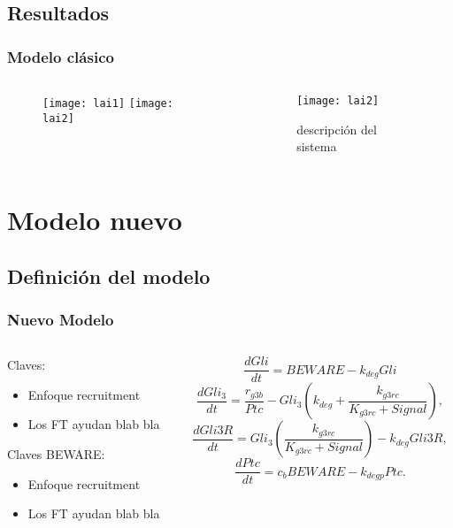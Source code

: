 \documentclass{beamer}
\begin{document}
\subsection{Resultados}
\begin{frame}
\frametitle{Modelo clásico}
\begin{columns}
	\begin{column}{0.5\textwidth}
		\begin{figure}
			\texttt{[image: lai1]}
			\texttt{[image: lai2]}
		\end{figure}
	\end{column}
	\begin{column}{0.5\textwidth}
		\begin{figure}
			\texttt{[image: lai2]}\caption{descripción del sistema}
		\end{figure}
	\end{column}
\end{columns}
\end{frame}

\section{Modelo nuevo}

\subsection{Definición del modelo}

\begin{frame}
\frametitle{Nuevo Modelo}
\begin{columns}
	\begin{column}{0.5\textwidth}
		Claves:
		\begin{itemize}
			\item Enfoque recruitment
			\item Los FT ayudan blab bla 
		\end{itemize}
		Claves BEWARE:
		\begin{itemize}
			\item Enfoque recruitment
			\item Los FT ayudan blab bla 
		\end{itemize}
	\end{column}
	\begin{column}{0.5\textwidth}
		{\tiny\[ \frac{dGli}{dt} = BEWARE-k_{deg}Gli \]}
		{\tiny\[ \frac{dGli_3}{dt} = \frac{r_{g3b}}{Ptc}-Gli_3\left(k_{deg}+\frac{k_{g3rc}}{K_{g3rc}+Signal}\right), \]}
		{\tiny\[ \frac{dGli3R}{dt}= Gli_3\left(\frac{k_{g3rc}}{K_{g3rc}+Signal}\right)-k_{deg}Gli3R, \]}
		{\tiny\[ \frac{dPtc}{dt} = c_bBEWARE-k_{degp}Ptc.\]}
		
	\end{column}
\end{columns}
\end{frame}
\end{document}
